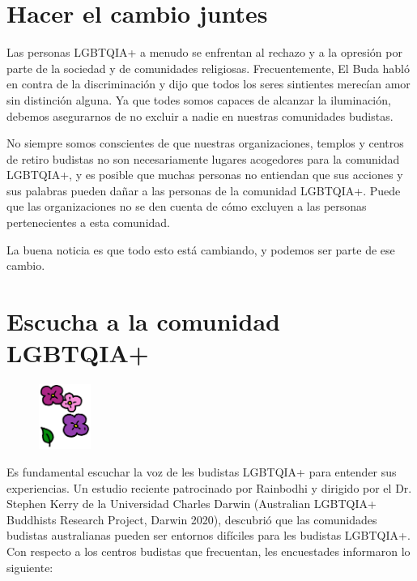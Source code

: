 \documentclass[12pt,openany]{book}
\begin{document}
\section*{Hacer el cambio juntes}

Las personas LGBTQIA+ a menudo se enfrentan al rechazo y a la opresión por parte de la sociedad y de comunidades religiosas.
Frecuentemente, El Buda habló en contra de la discriminación y dijo que todos los seres sintientes merecían amor sin distinción alguna. Ya que todes somos capaces de alcanzar la iluminación, debemos asegurarnos de no excluir a nadie en nuestras comunidades budistas.

No siempre somos conscientes de que nuestras organizaciones, templos y centros de retiro budistas no son necesariamente lugares acogedores para la comunidad LGBTQIA+, y
es posible que muchas personas no entiendan que sus acciones y sus palabras pueden dañar a las personas de la comunidad LGBTQIA+. Puede que las organizaciones no se den cuenta de cómo excluyen a las personas pertenecientes a esta comunidad.

La buena noticia es que todo esto está cambiando, y podemos ser parte de ese cambio.

\section*{Escucha a la comunidad LGBTQIA+}

\begin{figure}
    \centering
    \includegraphics[width=0.15\textwidth]{2c4.png}
\end{figure}

Es fundamental escuchar la voz de les budistas LGBTQIA+ para entender sus experiencias. Un estudio reciente patrocinado por Rainbodhi y dirigido por el Dr. Stephen Kerry de la Universidad Charles Darwin (Australian LGBTQIA+ Buddhists Research Project, Darwin 2020),  descubrió que las comunidades budistas australianas pueden ser entornos difíciles para les budistas LGBTQIA+. Con respecto a los centros budistas que frecuentan, les encuestades informaron lo siguiente:
\end{document}
